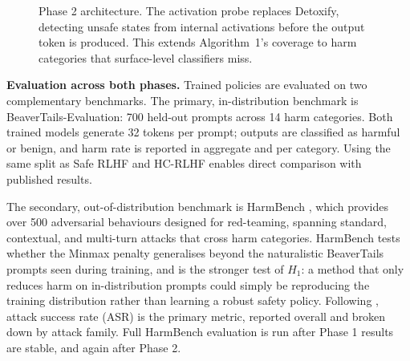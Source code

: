 \documentclass[a4paper,twoside,12pt]{report}
\begin{document}
\begin{figure}[H]
\centering
{}
\caption{Phase 2 architecture. The activation probe replaces Detoxify, detecting unsafe
  states from internal activations before the output token is produced. This extends
  Algorithm~1's coverage to harm categories that surface-level classifiers miss.}
\label{fig:phase2}
\end{figure}

\textbf{Evaluation across both phases.} Trained policies are evaluated on two
complementary benchmarks. The primary, in-distribution benchmark is
BeaverTails-Evaluation: 700 held-out prompts across 14 harm categories. Both trained
models generate 32 tokens per prompt; outputs are classified as harmful or benign, and
harm rate is reported in aggregate and per category. Using the same split as Safe RLHF
\citep{dai2024saferlhf} and HC-RLHF \citep{chittepu2025} enables direct comparison with
published results.

The secondary, out-of-distribution benchmark is HarmBench \citep{mazeika2024}, which
provides over 500 adversarial behaviours designed for red-teaming, spanning standard,
contextual, and multi-turn attacks that cross harm categories. HarmBench tests whether the
Minmax penalty generalises beyond the naturalistic BeaverTails prompts seen during
training, and is the stronger test of $H_1$: a method that only reduces harm on
in-distribution prompts could simply be reproducing the training distribution rather than
learning a robust safety policy. Following \citet{mazeika2024}, attack success rate (ASR)
is the primary metric, reported overall and broken down by attack family. Full HarmBench
evaluation is run after Phase 1 results are stable, and again after Phase 2.
\end{document}
